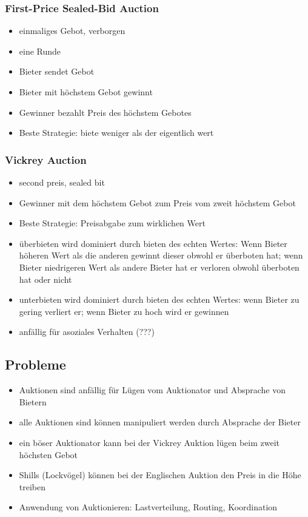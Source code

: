 \documentclass{article} %
\begin{document}
	\subsubsection{First-Price Sealed-Bid Auction}
	\begin{itemize}
		\item einmaliges Gebot, verborgen
		\item eine Runde
		\item Bieter sendet Gebot
		\item Bieter mit höchstem Gebot gewinnt
		\item Gewinner bezahlt Preis des höchstem Gebotes
		\item Beste Strategie: biete weniger als der eigentlich wert
	\end{itemize}
	\subsubsection{Vickrey Auction}
	\begin{itemize}
		\item second preis, sealed bit
		\item Gewinner mit dem höchstem Gebot zum Preis vom zweit höchstem Gebot
		\item Beste Strategie: Preisabgabe zum wirklichen Wert
		\item überbieten wird dominiert durch bieten des echten Wertes: Wenn Bieter höheren Wert als die anderen gewinnt dieser obwohl er überboten hat; wenn Bieter niedrigeren Wert als andere Bieter hat er verloren obwohl überboten hat oder nicht
		\item unterbieten wird dominiert durch bieten des echten Wertes: wenn Bieter zu gering verliert er; wenn Bieter zu hoch wird er gewinnen
		\item anfällig für asoziales Verhalten (???)
	\end{itemize}
	\subsection{Probleme}
	\begin{itemize}
		\item Auktionen sind anfällig für Lügen vom Auktionator und Absprache von Bietern
		\item alle Auktionen sind können manipuliert werden durch Absprache der Bieter
		\item ein böser Auktionator kann bei der Vickrey Auktion lügen beim zweit höchsten Gebot
		\item Shills (Lockvögel) können bei der Englischen Auktion den Preis in die Höhe treiben
		\item Anwendung von Auktionieren: Lastverteilung, Routing, Koordination
	\end{itemize}
\end{document}
